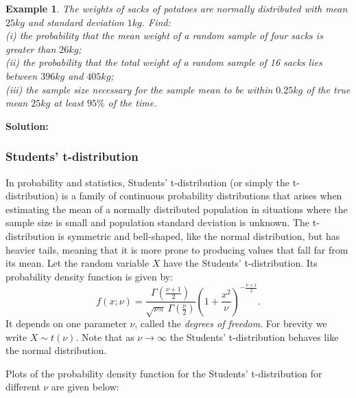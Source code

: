 \documentclass[12pt]{article}
\newtheorem{example}[theorem]{Example}
\begin{document}
\begin{example}
The weights of sacks of potatoes are normally distributed with mean $25kg$ and standard deviation $1kg$. Find:\\
(i) the probability that the mean weight of a random sample of four sacks is greater than $26kg$;\\
(ii) the probability that the total weight of a random sample of 16 sacks lies between $396kg$ and $405kg$;\\
(iii) the sample size necessary for the sample mean to be within $0.25kg$ of the true mean $25kg$ at least $95\%$ of the time.
\end{example}
\begin{mdframed}
{\bf Solution:}
\textcolor[rgb]{1.00,1.00,1.00}{\lipsum[1-6]}
\end{mdframed}


\subsubsection{Students' t-distribution}
In probability and statistics, Students' t-distribution (or simply the t-distribution) is a family of continuous probability distributions that arises when estimating the mean of a normally distributed population in situations where the sample size is small and population standard deviation is unknown. The t-distribution is symmetric and bell-shaped, like the normal distribution, but has heavier tails, meaning that it is more prone to producing values that fall far from its mean. Let the random variable $X$ have the Students' t-distribution. Its probability density function is given by:
$$f(x;\nu) = \frac{\Gamma(\frac{\nu+1}{2})} {\sqrt{\nu\pi}\,\Gamma(\frac{\nu}{2})} \left(1+\frac{x^2}{\nu} \right)^{-\frac{\nu+1}{2}}.$$
It depends on one parameter $\nu$, called the \emph{degrees of freedom}. For brevity we write $X \sim t(\nu)$.
Note that as $\nu \rightarrow \infty$ the Students' t-distribution behaves like the normal distribution.

Plots of the probability density function for the Students' t-distribution for different $\nu$ are given below:

\end{document}
